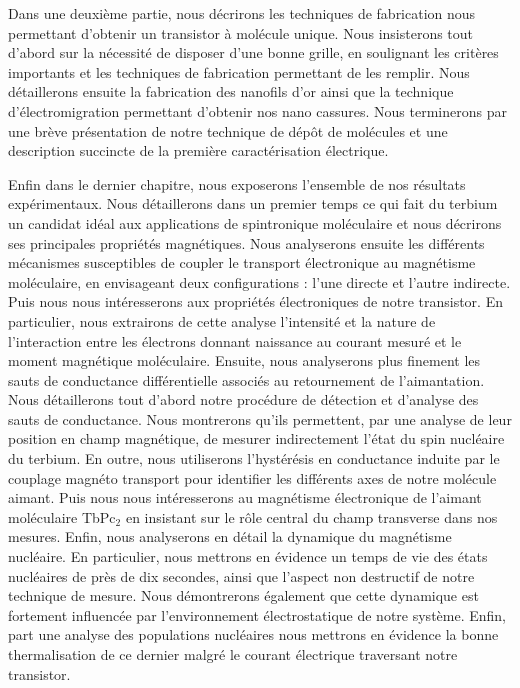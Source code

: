 Dans une deuxième partie, nous décrirons les techniques de fabrication nous permettant d'obtenir un transistor à molécule unique. Nous insisterons tout d'abord sur la nécessité de disposer d'une bonne grille, en soulignant les critères importants et les techniques de fabrication permettant de les remplir. Nous détaillerons ensuite la fabrication des nanofils d'or ainsi que la technique d'électromigration permettant d'obtenir nos nano cassures. Nous terminerons par une brève présentation de notre technique de dépôt de molécules et une description succincte de la première caractérisation électrique.

Enfin dans le dernier chapitre, nous exposerons l'ensemble de nos résultats expérimentaux. Nous détaillerons dans un premier temps ce qui fait du terbium un candidat idéal aux applications de spintronique moléculaire et nous décrirons ses principales propriétés magnétiques. Nous analyserons ensuite les différents mécanismes susceptibles de coupler le transport électronique au magnétisme moléculaire, en envisageant deux configurations : l'une directe et l'autre indirecte. Puis nous nous intéresserons aux propriétés électroniques de notre transistor. En particulier, nous extrairons de cette analyse l'intensité et la nature de l'interaction entre les électrons donnant naissance au courant mesuré et le moment magnétique moléculaire. Ensuite, nous analyserons plus finement les sauts de conductance différentielle associés au retournement de l'aimantation. Nous détaillerons tout d'abord notre procédure de détection et d'analyse des sauts de conductance. Nous montrerons qu'ils permettent, par une analyse de leur position en champ magnétique, de mesurer indirectement l’état du spin nucléaire du terbium. En outre, nous utiliserons l'hystérésis en conductance induite par le couplage magnéto transport pour identifier les différents axes de notre molécule aimant. Puis nous nous intéresserons au magnétisme électronique de l'aimant moléculaire TbPc$_{2}$ en insistant sur le rôle central du champ transverse dans nos mesures. Enfin, nous analyserons en détail la dynamique du magnétisme nucléaire. En particulier, nous mettrons en évidence un temps de vie des états nucléaires de près de dix secondes, ainsi que l'aspect non destructif de notre technique de mesure. Nous démontrerons également que cette dynamique est fortement influencée par l'environnement électrostatique de notre système. Enfin, part une analyse des populations nucléaires nous mettrons en évidence la bonne thermalisation de ce dernier malgré le courant électrique traversant notre transistor.